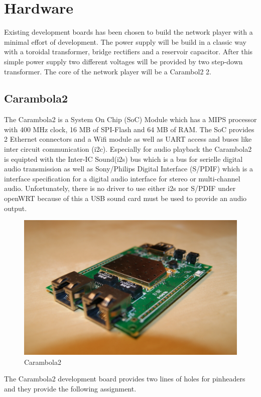 
\section{Hardware}
Existing development boards has been chosen to build the network player with a minimal  effort of development. The power supply will be build in a classic way with a toroidal transformer, bridge rectifiers and a reservoir capacitor. After this simple power supply two different voltages will be provided by two step-down transformer. The core of the network player will be a Carambol2 2.
\subsection{Carambola2}
The Carambola2 is a System On Chip (SoC) Module which has a MIPS processor with 400 MHz clock, 16 MB of SPI-Flash and 64 MB of RAM. The SoC provides 2 Ethernet connectors and a Wifi module as well as UART access and buses like inter circuit communication (i2c). Especially for audio playback the Carambola2 is equipted with the Inter-IC Sound(i2s) bus which is a bus for serielle digital audio transmission as well as Sony/Philips Digital Interface (S/PDIF) which is a interface specification for a digital audio interface for stereo or multi-channel audio. Unfortunately, there is no driver to use either i2s nor S/PDIF under openWRT because of this a USB sound card must be used to provide an audio output.
\begin{figure}[h!]
\begin{center}
\includegraphics[scale=0.4]{pictures/carambola2}
\caption{Carambola2}
\end{center}
\end{figure}
The Carambola2 development board provides two lines of holes for pinheaders and they provide the following assignment.

